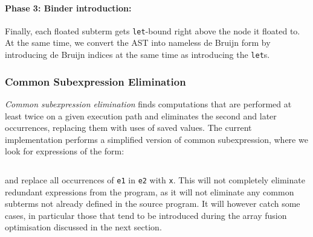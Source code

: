 \paragraph{Phase 3: Binder introduction:}

Finally, each floated subterm gets \texttt{let}-bound right above the node it
floated to. At the same time, we convert the AST into nameless de
Bruijn form by introducing de Bruijn indices at the same time
as introducing the \texttt{let}s.\\



\subsubsection{Common Subexpression Elimination}
\label{sec:cse}

\emph{Common subexpression elimination} finds computations that are performed at
least twice on a given execution path and eliminates the second and later
occurrences, replacing them with uses of saved values. The current
implementation performs a simplified version of common subexpression, where we
look for expressions of the form:
%
\begin{lstlisting}[style=Haskell,numbers=none]
%\bf$\langle$ common subexpression elimination $\rangle$% let x = e1 in [x/e1]e2
\end{lstlisting}
%
and replace all occurrences of \texttt{e1} in \texttt{e2} with \texttt{x}. This
will not completely eliminate redundant expressions from the program, as it will
not eliminate any common subterms not already defined in the source program. It
will however catch some cases, in particular those that tend to be introduced
during the array fusion optimisation discussed in the next section.

